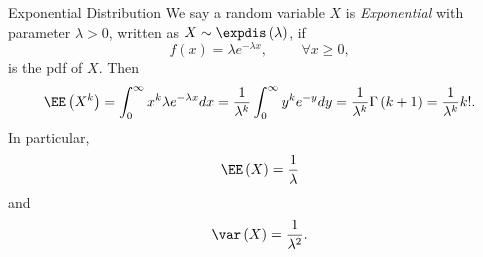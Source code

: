 \documentclass[stat901]{subfiles}
\begin{document}
    \rruleline

    \begin{example}{Exponential Distribution}
        We say a random variable $X$ is \emph{Exponential} with parameter $\lambda>0$, written as $X\sim\expdis\left( \lambda \right)$, if
        \begin{equation*}
            f\left( x \right) = \lambda e^{-\lambda x},\hspace{1cm}\forall x\geq 0,
        \end{equation*}
        is the pdf of $X$. Then
        \begin{equation*}
            \EE\left( X^k \right) = \int^{\infty}_{0} x^k\lambda e^{-\lambda x}dx = \frac{1}{\lambda^k} \int^{\infty}_{0}y^k e^{-y}dy = \frac{1}{\lambda^k}\Gamma\left( k+1 \right) = \frac{1}{\lambda^k}k!.
        \end{equation*}
        In particular,
        \begin{equation*}
            \EE\left( X \right) = \frac{1}{\lambda}
        \end{equation*}
        and
        \begin{equation*}
            \var\left( X \right) = \frac{1}{\lambda^{2}}.
        \end{equation*}
    \end{example}

    \rruleline


























    
    
    
    
    
\end{document}
